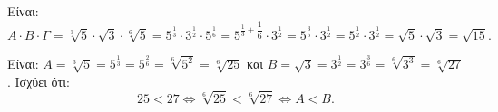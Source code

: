 
\begin{alist}
\item Είναι:
\[A \cdot B \cdot \Gamma = \sqrt[3]{5} \cdot \sqrt{3} \cdot \sqrt[6]{5} = 5^{\frac{1}{3}} \cdot 3^{\frac{1}{2}} \cdot 5^{\frac{1}{6}} = 5^{\frac{1}{3} + \dfrac{1}{6}} \cdot 3^{\frac{1}{2}} = 5^{\frac{3}{6}} \cdot 3^{\frac{1}{2}} = 5^{\frac{1}{2}} \cdot 3^{\frac{1}{2}} = \sqrt{5} \cdot \sqrt{3} = \sqrt{15}.\]

\item Είναι:
$A = \sqrt[3]{5} = 5^{\frac{1}{3}} = 5^{\frac{2}{6}} = \sqrt[6]{5^2} = \sqrt[6]{25}$ και $B = \sqrt{3} = 3^{\frac{1}{2}} = 3^{\frac{3}{6}} = \sqrt[6]{3^3} = \sqrt[6]{27}$.
Ισχύει ότι:
\[25 < 27 \Leftrightarrow \sqrt[6]{25} < \sqrt[6]{27} \Leftrightarrow A < B.\]
\end{alist}

